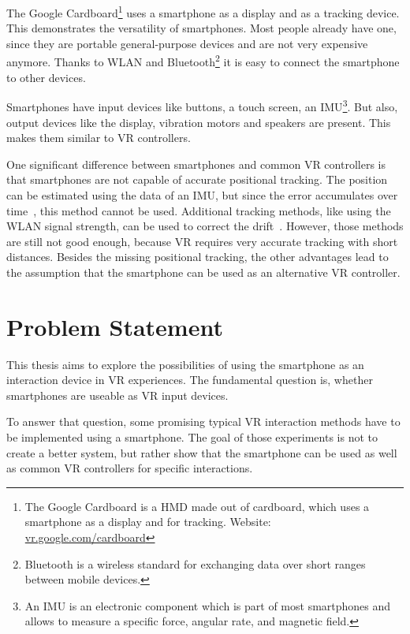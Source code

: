 The Google Cardboard\footnote{The Google Cardboard is a \ac{HMD} made out of cardboard, which uses a smartphone as a display and for tracking. Website: \href{https://vr.google.com/cardboard/}{vr.google.com/cardboard}} uses a smartphone as a display and as a tracking device. This demonstrates the versatility of smartphones. Most people already have one, since they are portable general-purpose devices and are not very expensive anymore. Thanks to \ac{WLAN} and Bluetooth\footnote{Bluetooth is a wireless standard for exchanging data over short ranges between mobile devices.} it is easy to connect the smartphone to other devices.

Smartphones have input devices like buttons, a touch screen, an \ac{IMU}\footnote{An IMU is an electronic component which is part of most smartphones and allows to measure a specific force, angular rate, and magnetic field.}. But also, output devices like the display, vibration motors and speakers are present. This makes them similar to \ac{VR} controllers.

One significant difference between smartphones and common \ac{VR} controllers is that smartphones are not capable of accurate positional tracking. The position can be estimated using the data of an \ac{IMU}, but since the error accumulates over time~\cite[44]{Steed.2013}, this method cannot be used. Additional tracking methods, like using the \ac{WLAN} signal strength, can be used to correct the drift~\cite{Zhang.2015}. However, those methods are still not good enough, because \ac{VR} requires very accurate tracking with short distances.
Besides the missing positional tracking, the other advantages lead to the assumption that the smartphone can be used as an alternative \ac{VR} controller.


\section{Problem Statement}\label{section:problem-statement}
This thesis aims to explore the possibilities of using the smartphone as an interaction device in \ac{VR} experiences. The fundamental question is, whether smartphones are useable as \ac{VR} input devices.

To answer that question, some promising typical \ac{VR} interaction methods have to be implemented using a smartphone. The goal of those experiments is not to create a better system, but rather show that the smartphone can be used as well as common \ac{VR} controllers for specific interactions.

